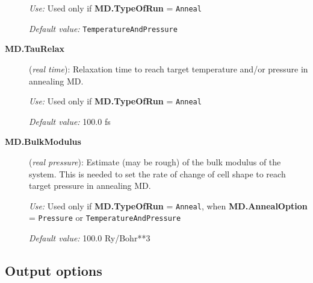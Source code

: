 \begin{description}
{\it Use:} Used only if {\bf MD.TypeOfRun} = {\tt Anneal}

{\it Default value:} {\tt TemperatureAndPressure}

\item[{\bf MD.TauRelax}] ({\it real time}): Relaxation time
to reach target temperature
and/or pressure in annealing MD.

{\it Use:} Used only if {\bf MD.TypeOfRun} = {\tt Anneal}

{\it Default value:} 100.0 fs

\item[{\bf MD.BulkModulus}] ({\it real pressure}): Estimate (may be rough) of
the bulk modulus of the system.
This is needed to set the rate of change of cell shape
to reach target pressure in annealing MD.

{\it Use:} Used only if {\bf MD.TypeOfRun} = {\tt Anneal}, when
{\bf MD.AnnealOption} = {\tt Pressure} or {\tt TemperatureAndPressure}

{\it Default value:} 100.0 Ry/Bohr**3
        
\end{description}



\vspace{5pt}
\subsection{Output options}

